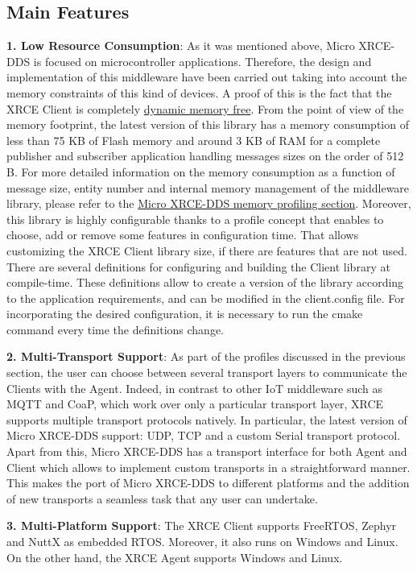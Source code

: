 \subsection{Main Features}
\textbf{1. Low Resource Consumption}: As it was mentioned above, Micro XRCE-DDS is focused on microcontroller applications. Therefore, the design and implementation of this middleware have been carried out taking into account the memory constraints of this kind of devices. A proof of this is the fact that the XRCE Client is completely \underline{dynamic memory free}. From the point of view of the memory footprint, the latest version of this library has a memory consumption of less than 75 KB of Flash memory and around 3 KB of RAM for a complete publisher and subscriber application handling messages sizes on the order of 512 B. For more detailed information on the memory consumption as a function of message size, entity number and internal memory management of the middleware library, please refer to the \href{https://micro.ros.org/docs/concepts/middleware/memo_prof/}{Micro XRCE-DDS memory profiling section}. Moreover, this library is highly configurable thanks to a profile concept that enables to choose, add or remove some features in configuration time. That allows customizing the XRCE Client library size, if there are features that are not used. There are several definitions for configuring and building the Client library at compile-time. These definitions allow to create a version of the library according to the application requirements, and can be modified in the client.config file. For incorporating the desired configuration, it is necessary to run the cmake command every time the definitions change.

\textbf{2. Multi-Transport Support}: As part of the profiles discussed in the previous section, the user can choose between several transport layers to communicate the Clients with the Agent. Indeed, in contrast to other IoT middleware such as MQTT and CoaP, which work over only a particular transport layer, XRCE supports multiple transport protocols natively. In particular, the latest version of Micro XRCE-DDS support: UDP, TCP and a custom Serial transport protocol. Apart from this, Micro XRCE-DDS has a transport interface for both Agent and Client which allows to implement custom transports in a straightforward manner. This makes the port of Micro XRCE-DDS to different platforms and the addition of new transports a seamless task that any user can undertake.

\textbf{3. Multi-Platform Support}: The XRCE Client supports FreeRTOS, Zephyr and NuttX as embedded RTOS. Moreover, it also runs on Windows and Linux. On the other hand, the XRCE Agent supports Windows and Linux.


